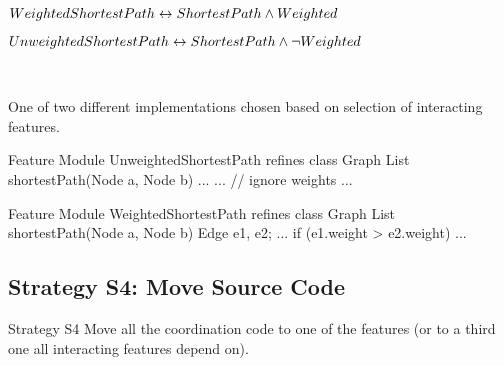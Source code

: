 \begin{frame}[fragile]{\myframetitle}
	\begin{mycolumns}[widths={55},animation=none]
		{\centering\small

		$WeightedShortestPath \leftrightarrow ShortestPath \wedge Weighted$

		$UnweightedShortestPath \leftrightarrow ShortestPath \wedge \neg Weighted$

		}~
		\begin{note}{}
			One of two different implementations chosen based on selection of interacting features.
		\end{note}
	\mynextcolumn
\begin{codetight}{Feature Module UnweightedShortestPath}
refines class Graph {
	List shortestPath(Node a, Node b){
		...
		...
		// ignore weights
		... 
	}
}
\end{codetight}
\begin{codetight}{Feature Module WeightedShortestPath}
refines class Graph {
	List shortestPath(Node a, Node b){
		Edge e1, e2;
		...
		if (e1.weight > e2.weight) 
		... 
	}
}
\end{codetight}	
	\end{mycolumns}
\end{frame}

\subsection{Strategy S4: Move Source Code}

\begin{frame}{\myframetitle}
	\begin{mycolumns}[widths={30},animation=none]
		\begin{definition}{Strategy S4}
			Move all the coordination code to one of the features (or to a third one all interacting features depend on).
		\end{definition}
	\mynextcolumn
	\end{mycolumns}
\end{frame}

